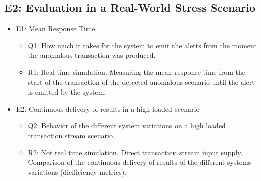 \subsection{E2: Evaluation in a Real-World Stress Scenario}

\begin{itemize}
\item{E1: Mean Response Time}

\begin{itemize}
  \item Q1: How much it takes for the system to emit the alerts from the moment the anomalous transaction was produced.
  \item R1: Real time simulation. Measuring the mean response time from the start of the transaction of the detected anomalous scenario until the alert is emitted by the system.
\end{itemize}

\item{E2: Continuous delivery of results in a high loaded scenario}

\begin{itemize}
  \item Q2: Behavior of the different system variations on a high loaded transaction stream scenario.
  \item R2: Not real time simulation. Direct transaction stream input supply. Comparison of the continuous delivery of results of the different systems variations (diefficiency metrics).
\end{itemize}
\end{itemize}

